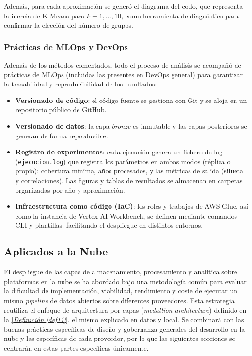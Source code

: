 Además, para cada aproximación se generó el diagrama del codo, que representa la inercia de K-Means para $k=1,\dots,10$, como herramienta de diagnóstico para confirmar la elección del número de grupos.

\subsubsection{Prácticas de MLOps y DevOps}

Además de los métodos comentados, todo el proceso de análisis se acompañó de prácticas de MLOps (incluidas las presentes en DevOps general) para garantizar la trazabilidad y reproducibilidad de los resultados:

\begin{itemize}
	\item \textbf{Versionado de código}: el código fuente se gestiona con Git y se aloja en un repositorio público de GitHub.
	\item \textbf{Versionado de datos}: la capa \textit{bronze} es inmutable y las capas posteriores se generan de forma reproducible.
	\item \textbf{Registro de experimentos}: cada ejecución genera un fichero de log (\texttt{ejecucion.log}) que registra los parámetros en ambos modos (réplica o propio): cobertura mínima, años procesados, y las métricas de salida (silueta y correlaciones). Las figuras y tablas de resultados se almacenan en carpetas organizadas por año y aproximación.
	\item \textbf{Infraestructura como código (IaC)}: los roles y trabajos de AWS Glue, así como la instancia de Vertex AI Workbench, se definen mediante comandos CLI y plantillas, facilitando el despliegue en distintos entornos.
\end{itemize}

\subsection{Aplicados a la Nube} \label{sec:Metodos_cloud}

El despliegue de las capas de almacenamiento, procesamiento y analítica sobre plataformas en la nube se ha abordado bajo una metodología común para evaluar la dificultad de implementación, viabilidad, rendimiento y coste de ejecutar un mismo \textit{pipeline} de datos abiertos sobre diferentes proveedores. Esta estrategia reutiliza el enfoque de arquitectura por capas (\textit{medallion architecture}) definido en la \hyperref[def11]{[\textit{Definición \ref*{def11}}]}, el mismo explicado en datos y local. Se combinará con las buenas prácticas específicas de diseño y gobernanza generales del desarrollo en la nube y las específicas de cada proveedor, por lo que las siguientes secciones se centrarán en estas partes específicas únicamente.

